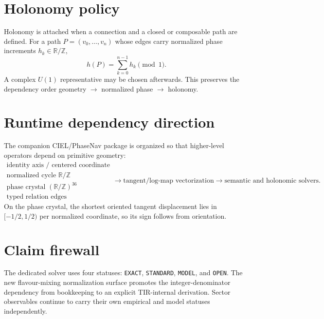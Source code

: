 \section{Holonomy policy}
Holonomy is attached when a connection and a closed or composable path are defined. For a path $P=(v_0,\ldots,v_n)$ whose edges carry normalized phase increments $h_k\in\mathbb R/\mathbb Z$,
\[
h(P)=\sum_{k=0}^{n-1}h_k\pmod1.
\]
A complex $U(1)$ representative may be chosen afterwards. This preserves the dependency order geometry $\to$ normalized phase $\to$ holonomy.

\section{Runtime dependency direction}
The companion CIEL/PhaseNav package is organized so that higher-level operators depend on primitive geometry:
\[
\boxed{
\begin{array}{c}
\text{identity axis / centered coordinate}\\
\text{normalized cycle }\mathbb R/\mathbb Z\\
\text{phase crystal }(\mathbb R/\mathbb Z)^{36}\\
\text{typed relation edges}
\end{array}
\longrightarrow
\text{tangent/log-map vectorization}
\longrightarrow
\text{semantic and holonomic solvers}.
}
\]
On the phase crystal, the shortest oriented tangent displacement lies in $[-1/2,1/2)$ per normalized coordinate, so its sign follows from orientation.

\section{Claim firewall}
The dedicated solver uses four statuses: \texttt{EXACT}, \texttt{STANDARD}, \texttt{MODEL}, and \texttt{OPEN}. The new flavour-mixing normalization surface promotes the integer-denominator dependency from bookkeeping to an explicit TIR-internal derivation. Sector observables continue to carry their own empirical and model statuses independently.
